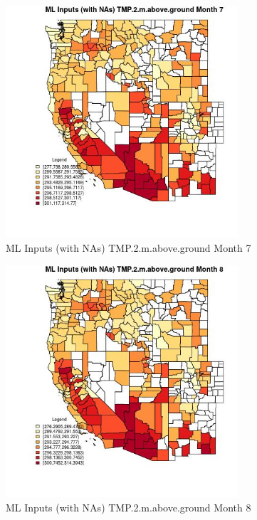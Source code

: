 \begin{figure} 
\centering  
\includegraphics[width=0.77\textwidth]{Code_Outputs/Report_ML_input_PM25_Step4_part_e_de_duplicated_aves_compiled_2019-05-21wNAs_CountyTMP2mabovegroundmedianMonth7.jpg} 
\caption{\label{fig:Report_ML_input_PM25_Step4_part_e_de_duplicated_aves_compiled_2019-05-21wNAsCountyTMP2mabovegroundmedianMonth7}ML Inputs (with NAs) TMP.2.m.above.ground Month 7} 
\end{figure} 
 

\begin{figure} 
\centering  
\includegraphics[width=0.77\textwidth]{Code_Outputs/Report_ML_input_PM25_Step4_part_e_de_duplicated_aves_compiled_2019-05-21wNAs_CountyTMP2mabovegroundmedianMonth8.jpg} 
\caption{\label{fig:Report_ML_input_PM25_Step4_part_e_de_duplicated_aves_compiled_2019-05-21wNAsCountyTMP2mabovegroundmedianMonth8}ML Inputs (with NAs) TMP.2.m.above.ground Month 8} 
\end{figure} 
 

